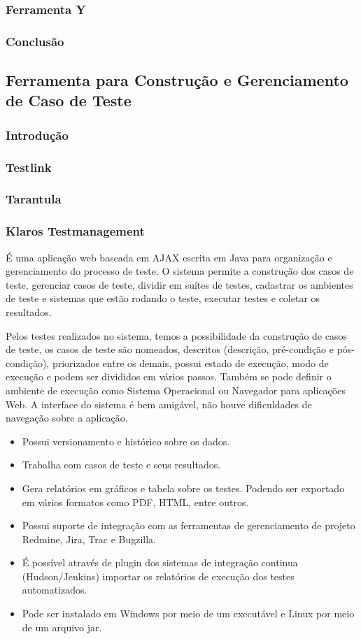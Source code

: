 \documentclass[12pt,a4paper]{article}
\begin{document}
		\subsubsection{Ferramenta Y}
		\subsubsection{Conclusão}

	\clearpage		
	\subsection{Ferramenta para Construção e Gerenciamento de Caso de Teste}
		\subsubsection{Introdução}
		\subsubsection{Testlink}
		\subsubsection{Tarantula}
		\subsubsection{Klaros Testmanagement}
			É uma aplicação web baseada em AJAX escrita em Java para organização e gerenciamento do processo de teste. O sistema
			permite a construção dos casos de teste, gerenciar casos de teste, dividir em suítes de testes, cadastrar os
			ambientes de teste e sistemas que estão rodando o teste, executar testes e coletar os resultados.
			
			Pelos testes realizados no sistema, temos a possibilidade da construção de casos de teste, os casos de teste são
			nomeados, descritos (descrição, pré-condição e pós-condição), priorizados entre os demais, possui estado de
			execução, modo de execução e podem ser divididos em vários passos. Também se pode definir o ambiente de execução
			como Sistema Operacional ou Navegador para aplicações Web. A interface do sistema é bem amigável, não houve
			dificuldades de navegação sobre a aplicação.
			
			\begin{itemize}
			  \item Possui versionamento e histórico sobre os dados.
			  \item Trabalha com casos de teste e seus resultados.
			  \item Gera relatórios em gráficos e tabela sobre os testes. Podendo ser exportado em vários formatos como PDF,
			  HTML, entre outros.
			  \item Possui suporte de integração com as ferramentas de gerenciamento de projeto Redmine, Jira, Trac e Bugzilla.
			  \item É possível através de plugin dos sistemas de integração continua (Hudson/Jenkins) importar os relatórios de
			  execução dos testes automatizados.
			  \item Pode ser instalado em Windows por meio de um executável e Linux por meio de um arquivo jar.
			\end{itemize}
			
\end{document}
